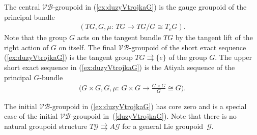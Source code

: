 \documentclass[pdftex]{sigma}
\renewcommand{\to}{\rightarrow}
\newcommand{\tto}{\rightrightarrows}
\newcommand{\gold}{\mscr{G}}
\newcommand{\mscr}[1]{\mathscr{#1}}
\numberwithin{equation}{section}
\begin{document}
The central $\mathcal{V}\!\mathcal{B}$-groupoid in (\ref{ex:duzyVtrojkaG}) is the gauge groupoid of the principal bundle
\begin{gather*} (TG,G,\mu\colon \, TG\to TG/G\cong T_eG).\end{gather*} Note that the group $G$ acts on the tangent bundle $TG$ by the tangent lift of the right action of $G$ on itself. The f\/inal $\mathcal{V}\!\mathcal{B}$-groupoid of the short exact sequence (\ref{ex:duzyVtrojkaG}) is the tangent group $TG\tto\{e\}$ of the group $G$. The upper short exact sequence in (\ref{ex:duzyVtrojkaG}) is the Atiyah sequence of the principal $G$-bundle
\begin{gather*} \big(G\times G,G,\mu\colon \, G\times G\to \tfrac{G\times G}{G}\cong G\big) .
\end{gather*}

\begin{Remark}The initial $\mathcal{V}\!\mathcal{B}$-groupoid in (\ref{ex:duzyVtrojkaG}) has core zero and is a special case of the initial $\mathcal{V}\!\mathcal{B}$-groupoid in~(\ref{duzyVtrojkaG}). Note that there is no natural groupoid structure $T\gold\tto A\gold$ for a general Lie groupoid~$\gold$.
\end{Remark}
\end{document}
